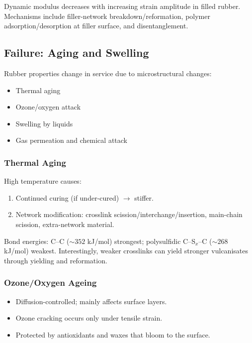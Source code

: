 \documentclass{NoteThesis/note-thesis}
\begin{document}
Dynamic modulus decreases with increasing strain amplitude in filled rubber. Mechanisms include filler-network breakdown/reformation, polymer adsorption/desorption at filler surface, and disentanglement.

\subsection{Failure: Aging and Swelling}

Rubber properties change in service due to microstructural changes:

\begin{itemize}
    \item Thermal aging
    \item Ozone/oxygen attack
    \item Swelling by liquids
    \item Gas permeation and chemical attack
\end{itemize}

\subsubsection*{Thermal Aging}

High temperature causes:

\begin{enumerate}
    \item Continued curing (if under-cured) $\rightarrow$ stiffer.
    \item Network modification: crosslink scission/interchange/insertion, main-chain scission, extra-network material.
\end{enumerate}

Bond energies: C--C ($\sim 352$ kJ/mol) strongest; polysulfidic C--S$_x$--C ($\sim 268$ kJ/mol) weakest. Interestingly, weaker crosslinks can yield stronger vulcanisates through yielding and reformation.

\subsubsection*{Ozone/Oxygen Ageing}

\begin{itemize}
    \item Diffusion-controlled; mainly affects surface layers.
    \item Ozone cracking occurs only under tensile strain.
    \item Protected by antioxidants and waxes that bloom to the surface.
\end{itemize}
\end{document}
